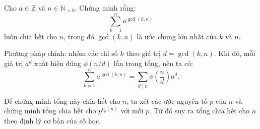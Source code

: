 \documentclass[../05-modular-arithmetic-a.tex]{subfiles}
\begin{document}
\begin{example*}
    Cho \( a \in \mathbb{Z} \) và \( n \in \mathbb{N}_{>0} \). Chứng minh rằng:
    \[
        \sum_{k=1}^{n} a^{\gcd(k,n)}
    \]
    luôn chia hết cho \( n \), trong đó \( \gcd(k,n) \) là ước chung lớn nhất của \( k \) và \( n \).
\end{example*}

\begin{story*}
    Phương pháp chính: nhóm các chỉ số \(k\) theo giá trị \(d = \gcd(k, n)\). Khi đó, mỗi giá trị \( a^d \) xuất hiện đúng \(\phi(n/d)\) lần trong tổng, nên ta có:
    \[
        \sum_{k=1}^{n} a^{\gcd(k,n)} = \sum_{d \mid n} \phi\left(\frac{n}{d}\right) a^d.
    \]
    
    Để chứng minh tổng này chia hết cho \(n\), ta xét các ước nguyên tố \(p\) của \(n\) và chứng minh tổng chia hết cho \(p^{v_p(n)}\) với mỗi \(p\). Từ đó suy ra tổng chia hết cho \(n\) theo định lý cơ bản của số học.
\end{story*}

\bigbreak
\end{document}
